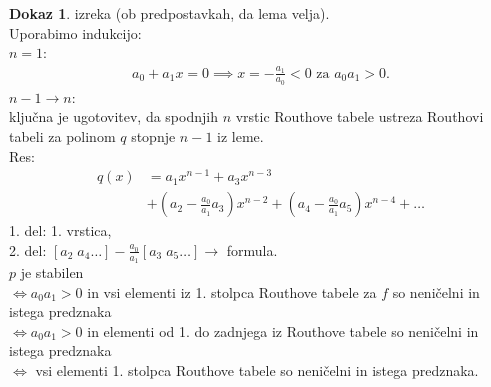 \documentclass[a4paper, 12pt]{book}
\theoremstyle{definition}
\newtheorem{pro}[counter]{Dokaz}
\theoremstyle{remark}
\begin{document}
\begin{pro} izreka (ob predpostavkah, da lema velja). \\
    Uporabimo indukcijo: \\
    $n=1$:
    \begin{align*}
        a_0 + a_1 x = 0 \implies x = -\frac{a_1}{a_0} < 0 \text{ za } a_0 a_1 > 0.
    \end{align*}
    $n-1 \to n$: \\
    ključna je ugotovitev, da spodnjih $n$ vrstic Routhove tabele ustreza
    Routhovi tabeli za polinom $q$ stopnje $n-1$ iz leme. \\
    Res: 
    \begin{align*}
        q(x) &= a_1 x^{n-1} + a_3 x^{n-3} \\
        &+ \left(a_2 - \frac{a_0}{a_1} a_3 \right) x^{n-2} + \left(a_4 - \frac{a_0}{a_1} a_5 \right) x^{n-4} + \dots
    \end{align*} 
    1. del: 1. vrstica, \\
    2. del: $[a_2 \; a_4 \dots] - \frac{a_0}{a_1} [a_3 \; a_5 \dots] \to$ formula. \\
    $p$ je stabilen \\
    $\iff a_0 a_1 > 0$ in vsi elementi iz 1. stolpca Routhove tabele za $f$ so neničelni
    in istega predznaka \\
    $\iff a_0 a_1 > 0$ in elementi od 1. do zadnjega iz Routhove tabele so neničelni
    in istega predznaka \\
    $\iff$ vsi elementi 1. stolpca Routhove tabele so neničelni in istega predznaka.
\end{pro}
\end{document}
